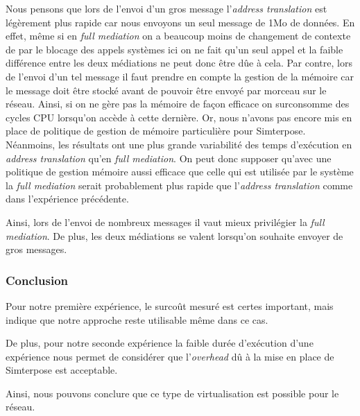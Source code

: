 Nous pensons que lors de l'envoi d'un gros message l'\textit{address translation} est légèrement plus rapide car nous envoyons un seul message de 1Mo de données. En effet, même si en \textit{full mediation} on a beaucoup moins de changement de contexte de par le blocage des appels systèmes ici on ne fait qu'un seul appel et la faible différence entre les deux médiations ne peut donc être dûe à cela. Par contre, lors de l'envoi d'un tel message il faut prendre en compte la gestion de la mémoire car le message doit être stocké avant de pouvoir être envoyé par morceau sur le réseau. Ainsi, si on ne gère pas la mémoire de façon efficace on surconsomme des cycles CPU lorsqu'on accède à cette dernière. Or, nous n'avons pas encore mis en place de politique de gestion de mémoire particulière pour Simterpose. Néanmoins, les résultats ont une plus grande variabilité des temps d'exécution en \textit{address translation} qu'en \textit{full mediation}. On peut donc supposer qu'avec une politique de gestion mémoire aussi efficace que celle qui est utilisée par le système la \textit{full mediation} serait probablement plus rapide que l'\textit{address translation} comme dans l'expérience précédente.

 Ainsi, lors de l'envoi de nombreux messages il vaut mieux privilégier la \textit{full mediation}. De plus, les deux médiations se valent lorsqu'on souhaite envoyer de gros messages.
\subsubsection{Conclusion}

Pour notre première expérience, le surcoût mesuré est certes important, mais indique que notre approche reste utilisable même dans ce cas.

De plus, pour notre seconde expérience la faible durée d'exécution d'une expérience nous permet de considérer que l'\textit{overhead} dû à la mise en place de Simterpose est acceptable.

Ainsi, nous pouvons conclure que ce type de virtualisation est possible pour le réseau.
